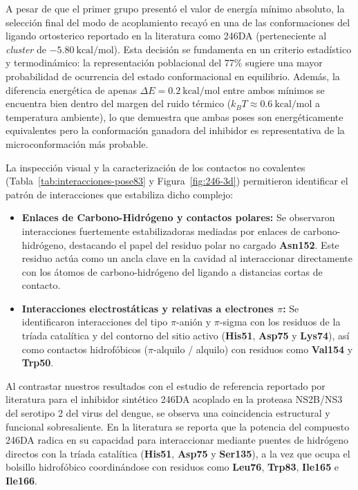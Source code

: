 A pesar de que el primer grupo presentó el valor de energía mínimo absoluto, la selección final del modo de acoplamiento recayó en una de las conformaciones del ligando ortosterico reportado en la literatura como 246DA (perteneciente al \textit{cluster} de $-5.80\ \text{kcal/mol}$). Esta decisión se fundamenta en un criterio estadístico y termodinámico: la representación poblacional del 77\% sugiere una mayor probabilidad de ocurrencia del estado conformacional en equilibrio. Además, la diferencia energética de apenas $\Delta E = 0.2\ \text{kcal/mol}$ entre ambos mínimos se encuentra bien dentro del margen del ruido térmico ($k_B T \approx 0.6\ \text{kcal/mol}$ a temperatura ambiente), lo que demuestra que ambas poses son energéticamente equivalentes pero la conformación ganadora del inhibidor  es representativa de la microconformación más probable.

La inspección visual y la caracterización de los contactos no covalentes  (Tabla~\ref{tab:interacciones-pose83} y Figura~\ref{fig:246-3d}) permitieron identificar el patrón de interacciones que estabiliza dicho complejo:

\begin{itemize}
    \item \textbf{Enlaces de Carbono-Hidrógeno y contactos polares:} Se observaron interacciones fuertemente estabilizadoras mediadas por enlaces de carbono-hidrógeno, destacando el papel del residuo polar no cargado \textbf{Asn152}. Este residuo actúa como un ancla clave en la cavidad al interaccionar directamente con los átomos de carbono-hidrógeno del ligando a distancias cortas de contacto.
    \item \textbf{Interacciones electrostáticas y relativas a electrones $\pi$:} Se identificaron interacciones del tipo $\pi$-anión y $\pi$-sigma con los residuos de la tríada catalítica y del contorno del sitio activo (\textbf{His51}, \textbf{Asp75} y \textbf{Lys74}), así como contactos hidrofóbicos ($\pi$-alquilo / alquilo) con residuos como \textbf{Val154} y \textbf{Trp50}.
\end{itemize}

Al contrastar nuestros resultados con el estudio de referencia reportado por literatura para el inhibidor sintético 246DA  acoplado en la proteasa NS2B/NS3 del serotipo 2 del virus del dengue, se observa una coincidencia estructural y funcional sobresaliente. En la literatura se reporta que la potencia del compuesto 246DA radica en su capacidad para interaccionar mediante puentes de hidrógeno directos con la tríada catalítica (\textbf{His51}, \textbf{Asp75} y \textbf{Ser135}), a la vez que ocupa el bolsillo hidrofóbico coordinándose con residuos como \textbf{Leu76}, \textbf{Trp83}, \textbf{Ile165} e \textbf{Ile166}. 


